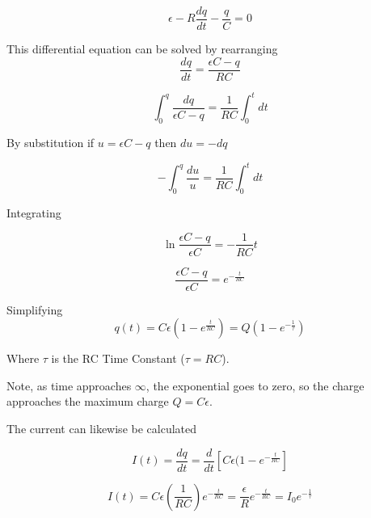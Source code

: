 \documentclass[14pt]{memoir}
\begin{document}
\begin{equation}
\epsilon - R \frac{dq}{dt}  - \frac{q}{C} = 0
\end{equation}

This differential equation can be solved by rearranging
\begin{equation}
\frac{dq}{dt} = \frac{\epsilon C - q}{RC}
\end{equation}

\begin{equation}
\int_0^q \frac{dq}{\epsilon C - q} = \frac{1}{RC} \int_0^t dt
\end{equation}

By substitution if $u = \epsilon C - q$ then $du = -dq$

\begin{equation}
- \int_0^q \frac{du}{u} = \frac{1}{RC} \int_0^t dt
\end{equation}

Integrating

\begin{equation}
\ln{\frac{\epsilon C - q}{\epsilon C}} = - \frac{1}{RC} t
\end{equation}

\begin{equation}
\frac{\epsilon C - q}{\epsilon C} = e^{-\frac{t}{RC}}
\end{equation}

Simplifying
\begin{equation}
q(t) = C\epsilon(1-e^{\frac{t}{RC}}) = Q(1-e^{-\frac{1}{\tau}})
\end{equation}

Where $\tau$ is the RC Time Constant ($\tau = RC$).

Note, as time approaches $\infty$, the exponential goes to zero, so the charge approaches the maximum charge $Q = C \epsilon$.

The current can likewise be calculated

\begin{equation}
I(t) = \frac{dq}{dt} = \frac{d}{dt} [C\epsilon(1-e^{-\frac{t}{RC}}]
\end{equation}

\begin{equation}
I(t) = C \epsilon (\frac{1}{RC}) e^{-\frac{t}{RC}} = \frac{\epsilon}{R}e^{-\frac{t}{RC}} = I_0 e^{-\frac{1}{\tau}}
\end{equation}
\end{document}
